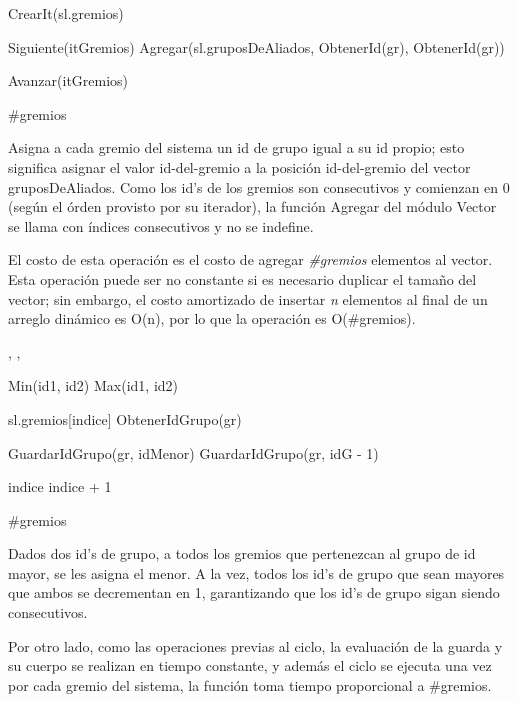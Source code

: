 {
	\state {} \asig CrearIt(sl.gremios)		
											
		\state
		
		\state {} \asig Siguiente(itGremios)							
		\state Agregar(sl.gruposDeAliados, ObtenerId(gr), ObtenerId(gr))	

		\state
		\state Avanzar(itGremios)											
	\endwhile
}
{ \#gremios }
{ Asigna a cada gremio del sistema un id de grupo igual a su id propio; esto significa asignar el valor id-del-gremio a la posici\'on id-del-gremio del vector gruposDeAliados. Como los id's de los gremios son consecutivos y comienzan en 0 (seg\'un el \'orden provisto por su iterador), la funci\'on Agregar del m\'odulo Vector se llama con \'indices consecutivos y no se indefine.

\hspace{10pt} El costo de esta operaci\'on es el costo de agregar \emph{\#gremios} elementos al vector. Esta operaci\'on puede ser no constante si es necesario duplicar el tamaño del vector; sin embargo, el costo amortizado de insertar \emph{n} elementos al final de un arreglo din\'amico es O(n), por lo que la operaci\'on es O(\#gremios). }

{, , }{}
{
	\state {} \asig Min(id1, id2)						
	\state {} \asig Max(id1, id2)						
	\state

	\state {} 										

									
		\state

		\state {} \asig sl.gremios[indice]					
		\state {} \asig ObtenerIdGrupo(gr)					
		\state

														
			\state GuardarIdGrupo(gr, idMenor)								
		\Else {}										
				\state GuardarIdGrupo(gr, idG - 1)							
			\endif
		\endif
		\state

		\state indice \asig indice + 1										
	\endwhile
}
{\#gremios}
{ Dados dos id's de grupo, a todos los gremios que pertenezcan al grupo de id mayor, se les asigna el menor. A la vez, todos los id's de grupo que sean mayores que ambos se decrementan en 1, garantizando que los id's de grupo sigan siendo consecutivos.

\hspace{10pt} Por otro lado, como las operaciones previas al ciclo, la evaluaci\'on de la guarda y su cuerpo se realizan en tiempo constante, y adem\'as el ciclo se ejecuta una vez por cada gremio del sistema, la funci\'on toma tiempo proporcional a \#gremios. }

